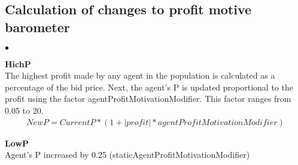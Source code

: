 \documentclass{article} %
\newenvironment{tightitemize}{
                \begin{list}{$\bullet$}{
                    \setlength{\itemsep}{-1pt}}{\setlength{\topsep}{0pt}}}{
                \end{list}}
\begin{document}
\subsection{Calculation of changes to profit motive barometer}
\begin{tightitemize}
\item {\bf HichP}\\
The highest profit made by any agent in the population is calculated
 as a percentage of the bid price. Next, the agent's P is updated 
proportional to the profit using the factor agentProfitMotivationModifier. 
This factor ranges from 0.05 to 20.
\begin{equation}
\begin{split}
New P = Current P * (1 + |profit| * agentProfitMotivationModifier)
\end{split}
\end{equation}

\item {\bf LowP}\\
Agent's P increased by 0.25 (staticAgentProfitMotivationModifier)

\end{tightitemize}
\end{document}
